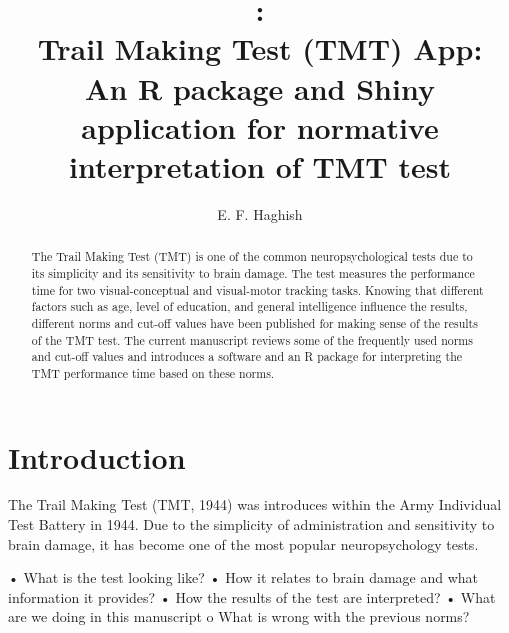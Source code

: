 \documentclass[]{article}
\title{: \\ }
\title{%
	Trail Making Test (TMT) App: \\
	\large An R package and Shiny application for normative interpretation of TMT test}
\author{E. F. Haghish}
\begin{document}
\maketitle

\begin{abstract}
	The Trail Making Test (TMT) is one of the common neuropsychological tests due to its simplicity and its sensitivity to brain damage. The test measures the performance time for two visual-conceptual and visual-motor tracking tasks. Knowing that different factors such as age, level of education, and general intelligence influence the results, different norms and cut-off values have been published for making sense of the results of the TMT test. The current manuscript reviews some of the frequently used norms and cut-off values and introduces a software and an R package for interpreting the TMT performance time based on these norms.  
\end{abstract}

\section{Introduction}
	The Trail Making Test (TMT, 1944) was introduces within the Army Individual Test Battery in 1944. Due to the simplicity of administration and sensitivity to brain damage, it has become one of the most popular neuropsychology tests. 
	
	
	•	What is the test looking like?
	•	How it relates to brain damage and what information it provides?
	•	How the results of the test are interpreted?
	•	What are we doing in this manuscript
	o	What is wrong with the previous norms?
	
\end{document}
